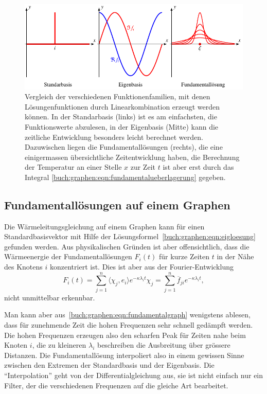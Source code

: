 \begin{figure}
\centering
\includegraphics{chapters/70-graphen/images/fundamental.pdf}
\caption{Vergleich der verschiedenen Funktionenfamilien, mit denen
Lösungenfunktionen durch Linearkombination erzeugt werden können.
In der Standarbasis (links) ist es am einfachsten, die Funktionswerte
abzulesen, in der Eigenbasis (Mitte) kann die zeitliche Entwicklung
besonders leicht berechnet werden.
Dazuwischen liegen die Fundamentallösungen (rechts), die eine einigermassen
übersichtliche Zeitentwicklung haben, die Berechnung der Temperatur an 
einer Stelle $x$ zur Zeit $t$ ist aber erst durch das Integral
\eqref{buch:graphen:eqn:fundamentalueberlagerung} gegeben.
\label{buch:graphen:fig:fundamental}}
\end{figure}

\subsection{Fundamentallösungen auf einem Graphen}
Die Wärmeleitungsgleichung auf einem Graphen kann für einen
Standardbasisvektor mit Hilfe der
Lösungsformel~\eqref{buch:graphen:eqn:eigloesung}
gefunden werden.
Aus physikalischen Gründen ist aber offensichtlich, dass die
Wärmeenergie der Fundamentallösungen $F_i(t)$ für kurze Zeiten $t$
in der Nähe des Knotens $i$ konzentriert ist.
Dies ist aber aus der Fourier-Entwicklung
\begin{equation}
F_i(t)
=
\sum_{j=1}^n \langle \chi_j,e_i\rangle e^{-\kappa \lambda_i t} \chi_j
=
\sum_{j=1}^n \overline{f}_{ji} e^{-\kappa \lambda_i t},
\label{buch:graphen:eqn:fundamentalgraph}
\end{equation}
nicht unmittelbar erkennbar.

Man kann aber aus~\eqref{buch:graphen:eqn:fundamentalgraph}
wenigstens ablesen,
dass für zunehmende Zeit die hohen Frequenzen sehr schnell gedämpft
werden.
Die hohen Frequenzen erzeugen also den scharfen Peak für Zeiten nahe
beim Knoten $i$, die zu kleineren $\lambda_i$ beschreiben die Ausbreitung
über grössere Distanzen.
Die Fundamentallösung interpoliert also in einem gewissen Sinne zwischen
den Extremen der Standardbasis und der Eigenbasis.
Die ``Interpolation'' geht von der Differentialgleichung aus,
sie ist nicht einfach nur ein Filter, der die verschiedenen Frequenzen
auf die gleiche Art bearbeitet.

